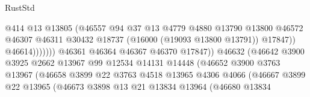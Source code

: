 \begin{lexlean}{RustStd}
\begin{coremodule}
                                                @414
                                                @13
                                                @13805
                                                (@46557
                                                  @94
                                                  @37
                                                  @13
                                                  @4779
                                                  @4880
                                                  @13790
                                                  @13800
                                                  @46572
                                                  @46307
                                                  @46311
                                                  @30432
                                                  @18737
                                                  (@16000 (@19093 @13800 @13791))
                                                  @17847))
                                              @46614)))))))
                                @46361
                                @46364
                                @46367
                                @46370
                                @17847))
                            @46632
                            (@46642
                              @3900
                              @3925
                              @2662
                              @13967
                              @99
                              @12534
                              @14131
                              @14448
                              (@46652
                                @3900
                                @3763
                                @13967
                                (@46658
                                  @3899
                                  @22
                                  @3763
                                  @4518
                                  @13965
                                  @4306
                                  @4066
                                  (@46667
                                    @3899
                                    @22
                                    @13965
                                    (@46673
                                      @3898
                                      @13
                                      @21
                                      @13834
                                      @13964
                                      (@46680
                                        @13834

\end{coremodule}
\end{lexlean}
